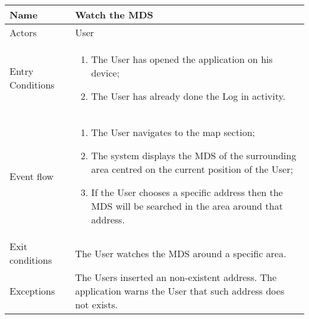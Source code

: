 \begin{table}[H]
  \centering
  \begin{tabularx}{\textwidth}{ |l|X| }
    \hline
    Name & Watch the MDS\\
    \hline
    Actors & User\\
    \hline
    Entry Conditions & \begin{enumerate}[noitemsep]
                        \item The User has opened the application on his device;
                        \item The User has already done the Log in activity.
                      \end{enumerate}\\
    \hline
    Event flow & \begin{enumerate}[noitemsep]
                    \item The User navigates to the map section;
                    \item The system displays the MDS of the surrounding area centred on the current position of the User;
                    \item If the User chooses a specific address then the MDS will be searched in the area around that address.                
                \end{enumerate}\\
    \hline
    Exit conditions & The User watches the MDS around a specific area. \\ 
    \hline
    Exceptions & The Users inserted an non-existent address. The application warns the User that such address does not exists.
                \\
    \hline
  \end{tabularx}
\end{table}
